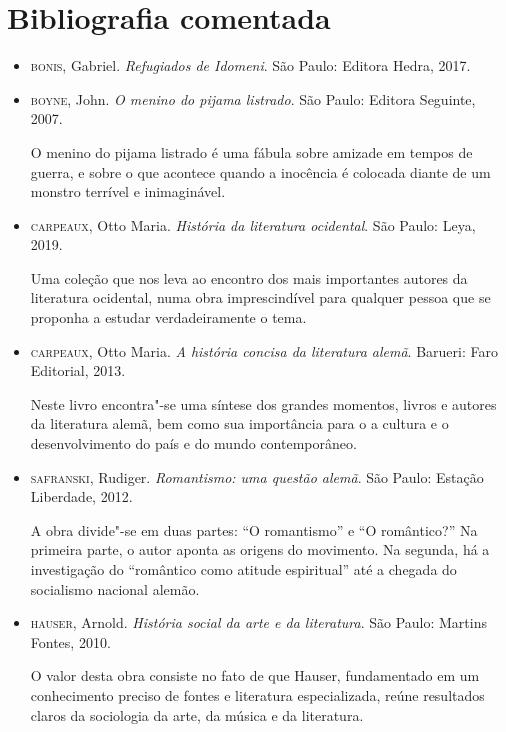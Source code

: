 \documentclass[12pt]{extarticle}
\begin{document}
\section{Bibliografia comentada}

\begin{itemize}

\item \textsc{bonis}, Gabriel. \textit{Refugiados de Idomeni}. São Paulo: Editora Hedra, 2017.

\item\textsc{boyne}, John. \textit{O menino do pijama listrado}. São Paulo: Editora
Seguinte, 2007.

O menino do pijama listrado é uma fábula sobre amizade em tempos de
guerra, e sobre o que acontece quando a inocência é colocada diante de
um monstro terrível e inimaginável.

\item\textsc{carpeaux}, Otto Maria. \textit{História da literatura ocidental}. São
Paulo: Leya, 2019.

Uma coleção que nos leva ao encontro dos mais importantes autores da
literatura ocidental, numa obra imprescindível para qualquer pessoa que
se proponha a estudar verdadeiramente o tema.

\item\textsc{carpeaux}, Otto Maria. \textit{A história concisa da literatura alemã}.
Barueri: Faro Editorial, 2013.

Neste livro encontra"-se uma síntese dos grandes momentos, livros e
autores da literatura alemã, bem como sua importância para o a cultura e
o desenvolvimento do país e do mundo contemporâneo.

\item\textsc{safranski}, Rudiger. \textit{Romantismo: uma questão alemã}. São
Paulo: Estação Liberdade, 2012.

A obra divide"-se em duas partes: ``O romantismo'' e ``O romântico?'' Na
primeira parte, o autor aponta as origens do movimento. Na segunda, há a
investigação do ``romântico como atitude espiritual'' até a chegada do
socialismo nacional alemão.

\item\textsc{hauser}, Arnold. \textit{História social da arte e da literatura}. São
Paulo: Martins Fontes, 2010.

O valor desta obra consiste no fato de que Hauser, fundamentado em um
conhecimento preciso de fontes e literatura especializada, reúne
resultados claros da sociologia da arte, da música e da literatura.
\end{itemize}
\end{document}
